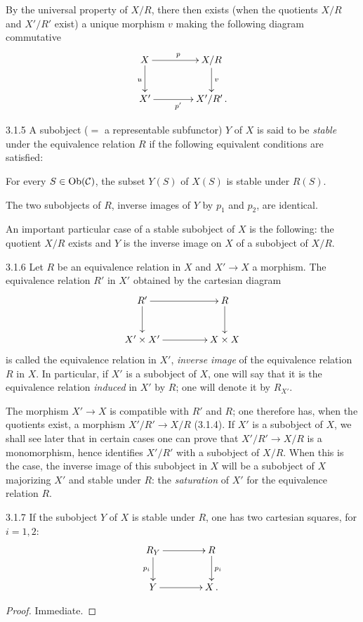 By the universal property of \(X/R\), there then exists (when the quotients
\(X/R\) and \(X'/R'\) exist) a unique morphism \(v\) making the following
diagram commutative
\[
\xymatrix@C=4em@R=2.4em{
X \ar[r]^{p} \ar[d]_{u}
  & X/R \ar[d]^{v} \\
X' \ar[r]_{p'}
  & X'/R'\,.
}
\]

\begin{definition}{3.1.5}
\label{IV.3.1.5}
A subobject (\(={}\) a representable subfunctor) \(Y\) of \(X\) is said to
be \emph{stable} under the equivalence relation \(R\) if the following
equivalent conditions are satisfied:
\begin{enumeratei}
\item For every \(S\in\operatorname{Ob}(\mathcal{C})\), the subset \(Y(S)\) of \(X(S)\) is
stable under \(R(S)\).
\item The two subobjects of \(R\), inverse images of \(Y\) by \(p_{1}\) and
\(p_{2}\), are identical.
\end{enumeratei}
\end{definition}

An important particular case of a stable subobject of \(X\) is the
following: the quotient \(X/R\) exists and \(Y\) is the inverse image on
\(X\) of a subobject of \(X/R\).

\begin{definition}{3.1.6}
\label{IV.3.1.6}
Let \(R\) be an equivalence relation in \(X\) and \(X'\to X\) a morphism.
The equivalence relation \(R'\) in \(X'\) obtained by the cartesian diagram
\[
\xymatrix@C=4.5em@R=2.6em{
R' \ar[r] \ar[d]
  & R \ar[d] \\
X'\times X' \ar[r]
  & X\times X
}
\]
is called the equivalence relation in \(X'\), \emph{inverse image} of the
equivalence relation \(R\) in \(X\). In particular, if \(X'\) is a subobject
of \(X\), one will say that it is the equivalence relation \emph{induced}
in \(X'\) by \(R\); one will denote it by \(R_{X'}\).
\end{definition}

The morphism \(X'\to X\) is compatible with \(R'\) and \(R\); one therefore
has, when the quotients exist, a morphism \(X'/R'\to X/R\) (3.1.4). If
\(X'\) is a subobject of \(X\), we shall see later that in certain cases one
can prove that \(X'/R'\to X/R\) is a monomorphism, hence identifies
\(X'/R'\) with a subobject of \(X/R\). When this is the case, the inverse
image of this subobject in \(X\) will be a subobject of \(X\) majorizing
\(X'\) and stable under \(R\): the \emph{saturation} of \(X'\) for the
equivalence relation \(R\).

\begin{proposition}{3.1.7}
\label{IV.3.1.7}
If the subobject \(Y\) of \(X\) is stable under \(R\), one has two cartesian
squares, for \(i=1,2\):
\[
\xymatrix@C=4em@R=2.4em{
R_{Y} \ar[r] \ar[d]_{p_{i}}
  & R \ar[d]^{p_{i}} \\
Y \ar[r]
  & X\,.
}
\]
\end{proposition}

\begin{proof}
Immediate.
\end{proof}
